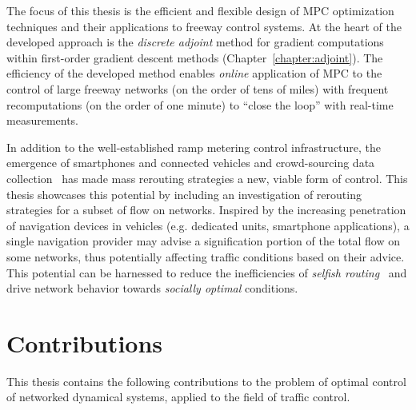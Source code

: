 The focus of this thesis is the efficient and flexible design of MPC optimization techniques and their applications to freeway control systems. At the heart of the developed approach is the \emph{discrete adjoint} method for gradient computations within first-order gradient descent methods (Chapter~\ref{chapter:adjoint}). The efficiency of the developed method enables \emph{online} application of MPC to the control of large freeway networks (on the order of tens of miles) with frequent recomputations (on the order of one minute) to ``close the loop'' with real-time measurements.

In addition to the well-established ramp metering control infrastructure, the emergence of smartphones and connected vehicles and crowd-sourcing data collection~\cite{Reilly2013,Ervasti2011,dashti2013evaluating} has made mass rerouting strategies a new, viable form of control. This thesis showcases this potential by including an investigation of rerouting strategies for a subset of flow on networks. Inspired by the increasing penetration of navigation devices in vehicles (e.g. dedicated units, smartphone applications), a single navigation provider may advise a signification portion of the total flow on some networks, thus potentially affecting traffic conditions based on their advice. This potential can be harnessed to reduce the inefficiencies of \emph{selfish routing}~\cite{roughgarden2002bad,krichenetac} and drive network behavior towards \emph{socially optimal} conditions.

\section{Contributions}
\label{sec:contributions}

This thesis contains the following contributions to the problem of optimal control of networked dynamical systems, applied to the field of traffic control.

